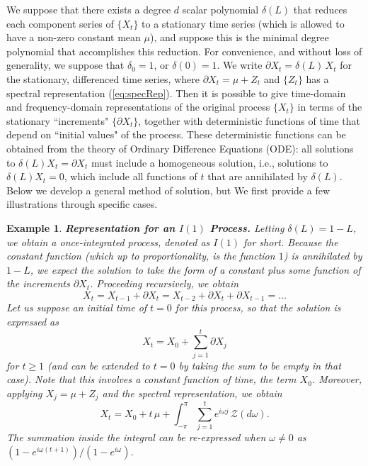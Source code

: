 \documentclass[a4paper]{book}
\newtheorem{Example}{Example}
\begin{document}
 We suppose that there exists a degree $d$ scalar polynomial $\delta (L)$
  that reduces each component series of $\{ X_t \}$ to a stationary
   time series (which is allowed to have a non-zero constant mean $\mu$),
   and suppose this is the minimal degree polynomial that accomplishes
    this reduction.  For convenience, and without loss of generality,
    we suppose that $\delta_0 = 1$, or $\delta (0) = 1$.
    We write $\partial X_t = \delta (L) \, X_t$ for
  the stationary, differenced time series,
   where $\partial X_t = \mu + Z_t$ and $\{ Z_t \}$ has a spectral
    representation (\ref{eq:specRep}).  Then it is possible
   to give time-domain and frequency-domain representations of
    the original process $\{ X_t \}$ in terms of the stationary
  ``increments" $\{ \partial X_t \}$, together with deterministic functions
  of time that depend on ``initial values" of the process.
   These deterministic functions can be obtained from 
   the theory of Ordinary Difference Equations (ODE): 
  all solutions to   $\delta (L) X_t = \partial X_t$
   must include a homogeneous solution, i.e., solutions to
    $\delta (L) X_t = 0$,   which include all functions of 
    $t$ that are annihilated by $\delta (L)$.  Below we develop
  a general method of solution, but We first provide a few
   illustrations through specific cases.
 
 \begin{Example} {\bf Representation for an $I(1)$ Process.}  \rm
 \label{exam:I1-rep}
    Letting $\delta (L)= 1-L$, we obtain a once-integrated process,
  denoted as $I(1)$ for short.    
  Because  the constant function (which up to proportionality, is the function $1$)
  is annihilated by $1-L$, we expect the solution to take the form
   of a constant plus some function of the increments $\partial X_t$.
   Proceeding recursively, we obtain
\[
  X_t =    X_{t-1} + \partial X_t = X_{t-2} + \partial X_t + \partial X_{t-1} = \ldots
\]
    Let us suppose an initial time of $t=0$ for this process, so that the
      solution is expressed as 
\[
 X_t = X_0 + \sum_{j=1}^t \partial X_j
\]
    for $t \geq 1$ (and can be extended to $t=0$ by taking the sum to be empty in that case).
  Note that this involves a constant function of time,
  the term $X_0$.  Moreover, applying $X_j = \mu + Z_j$ and the spectral representation,
  we obtain
\begin{equation*}
 X_t = X_0 + t \, \mu +   \int_{-\pi}^{\pi} \sum_{j=1}^t e^{i \omega j}
   \, \mathcal{Z} (d\omega).  
\end{equation*}
  The summation inside the integral can be re-expressed when $\omega \neq 0$ as
  $(1 - e^{i \omega (t+1)})/(1-e^{i \omega})$.
\end{Example}   
\end{document}
